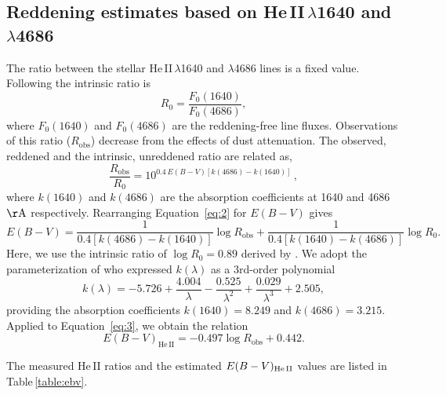 \documentclass[linenumbers]{aastex63}
\begin{document}
\subsection{Reddening estimates based on He\,II\,$\lambda$1640 and $\lambda$4686}\label{sect:red_heii}
The ratio between the stellar He\,II\,$\lambda$1640 and $\lambda$4686 lines is a fixed value. Following \citet{leitherer_he_2019} the intrinsic ratio is 
\begin{equation}
    R_0 = \frac{F_0(1640)}{F_0(4686)},
\end{equation}
where $F_0(1640)$ and $F_0(4686)$ are the reddening-free line fluxes.
Observations of this ratio ($R_{\mathrm{obs}}$) decrease from the effects of dust attenuation. 
The observed, reddened and the intrinsic, unreddened ratio are related as, 
\begin{equation}
    \frac{R_{\mathrm{obs}}}{R_{\mathrm{0}}} = 10^{0.4\, E(B-V) [k(4686) - k(1640)]}\, , \label{eq:2}
\end{equation}
where $k(1640)$ and $k(4686)$ are the absorption coefficients at 1640 and 4686 ${\rm \AA}$ respectively. Rearranging Equation~\ref{eq:2} for $E(B-V)$ gives
\begin{equation}\label{eq:3}
    E(B-V) = \frac{1}{0.4 [k(4686) - k(1640)]}\log R_{\mathrm{obs}} + \frac{1}{0.4 [k(1640) - k(4686)]}\log R_{0}.  
\end{equation}
Here, we use the intrinsic ratio of $\log R_0 = 0.89$ derived by \citet{leitherer_he_2019}. We adopt the parameterization of \citet{reddy_mosdef_2015} who expressed $k(\lambda)$ as a 3rd-order polynomial
\begin{equation}\label{eq:4}
    k(\lambda) = -5.726 + \frac{4.004}{\lambda} - \frac{0.525}{\lambda^2} + \frac{0.029}{\lambda^3} + 2.505,
\end{equation}
providing the absorption coefficients $k(1640)=8.249$ and $k(4686)=3.215$. 
Applied to Equation~\ref{eq:3}, we obtain the relation 
\begin{equation}\label{eq:5}
    E(B-V)_{\mathrm{He\, II}} = - 0.497 \log R_{\mathrm{obs}} + 0.442.
\end{equation}

The measured He\,II ratios and the estimated ${E(B-V)_{\rm He\,II}}$ values are listed in Table\,\ref{table:ebv}.
\end{document}

